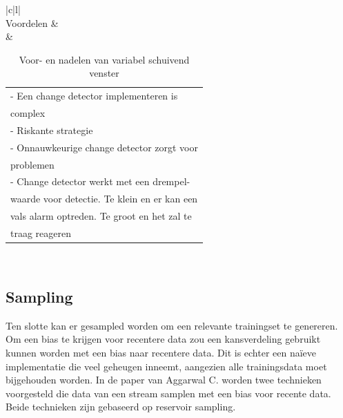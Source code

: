\begin{table}[!ht]
\begin{tabular}{|c|l|}
\hline
{} \\ \hline
Voordelen &  \\ \hline
{} & \begin{tabular}[c]{@{}l@{}}- Een change detector implementeren is \\ \phantom{-} complex\\ - Riskante strategie\\ - Onnauwkeurige change detector zorgt voor\\ \phantom{-} problemen\\ - Change detector werkt met een drempel-\\\phantom{-} waarde voor detectie. Te klein en er kan een \\ \phantom{-} vals alarm optreden. Te groot en het zal te \\ \phantom{-} traag reageren\end{tabular} \\ \hline
\end{tabular}
\caption{Voor- en nadelen van variabel schuivend venster}
\label{tab:voor- en nadelen van variabele sliding window}
\end{table}
\newpage
\subsection{Sampling}
Ten slotte kan er gesampled worden om een relevante trainingset te genereren. Om een bias te krijgen voor recentere data zou een kansverdeling gebruikt kunnen worden met een bias naar recentere data. Dit is echter een naïeve implementatie die veel geheugen inneemt, aangezien alle trainingsdata moet bijgehouden worden. In de paper van Aggarwal C. \cite{biased reservoir sampling} worden twee technieken voorgesteld die data van een stream samplen met een bias voor recente data. Beide technieken zijn gebaseerd op reservoir sampling.

